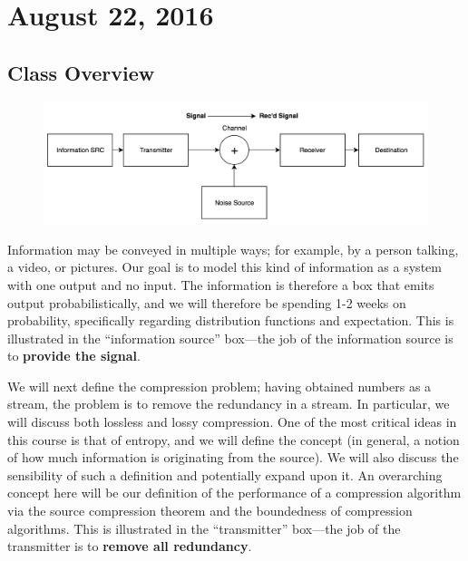 \documentclass[11pt]{article}
\theoremstyle{definition}
\begin{document}
\title{}
\author{Manan Shah\\ \texttt{manan.shah.777@gmail.com} \\ The Harker School}
\maketitle
\begin{abstract}
This document contains lecture notes from Harker's Advanced Topics in Mathematics class in Information Theory, Parts I and II. These notes were taken using TeXShop and \LaTeX2$\epsilon$ and will be updated for each class. The reader is advised to note any errata at the source control repository \texttt{https://github.com/mananshah99/infotheory}.
\end{abstract}
\tableofcontents
\newpage


\section{August 22, 2016}
\subsection{Class Overview}
\begin{figure}[h]
\centering
\includegraphics[scale=0.5]{pipeline}
\end{figure}
Information may be conveyed in multiple ways; for example, by a person talking, a video, or pictures. Our goal is to model this kind of information as a system with one output and no input. The information is therefore a box that emits output probabilistically, and we will therefore be spending 1-2 weeks on probability, specifically regarding distribution functions and expectation. This is illustrated in the ``information source'' box---the job of the information source is to \textbf{provide the signal}. 

We will next define the compression problem; having obtained numbers as a stream, the problem is to remove the redundancy in a stream. In particular, we will discuss both lossless and lossy compression. One of the most critical ideas in this course is that of entropy, and we will define the concept (in general, a notion of how much information is originating from the source). We will also discuss the sensibility of such a definition and potentially expand upon it. An overarching concept here will be our definition of the performance of a compression algorithm via the source compression theorem and the boundedness of compression algorithms. This is illustrated in the ``transmitter'' box---the job of the transmitter is to \textbf{remove all redundancy}.
\end{document}

